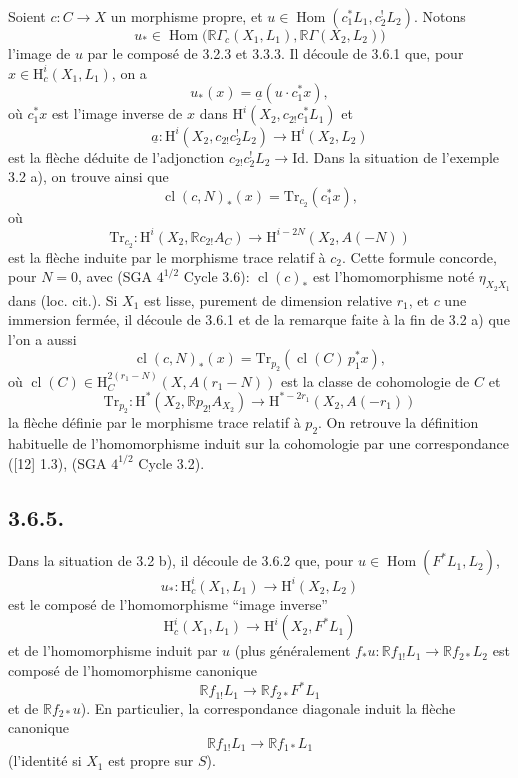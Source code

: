 \documentclass[11pt]{article}
\renewcommand{\H}{\mathrm{H}}
\DeclareMathOperator{\Hom}{Hom}
\newcommand{\R}{\mathbb{R}}\newcommand{\RHomCore}{\mathbb{R}\mathrm{Hom}}
\providecommand{\Id}{\mathrm{Id}}
\providecommand{\Hom}{\operatorname{Hom}}
\providecommand{\R}{\mathrm R}
\providecommand{\Hom}{\operatorname{Hom}}
\begin{document}
Soient $c:C\to X$ un morphisme propre, et $u\in\Hom(c_1^*L_1,c_2^!L_2)$. Notons
\[
u_*\in\Hom\bigl(\R\Gamma_c(X_1,L_1),\R\Gamma(X_2,L_2)\bigr)
\]
l'image de $u$ par le composé de 3.2.3 et 3.3.3. Il découle de 3.6.1 que, pour $x\in\H_c^i(X_1,L_1)$, on a
\begin{equation}
u_*(x)=\underline{a}(u\cdot c_1^*x),
\tag{3.6.2}
\end{equation}
où $c_1^*x$ est l'image inverse de $x$ dans $\H^i(X_2,c_{2!}c_1^*L_1)$ et
\[
\underline{a}:\H^i(X_2,c_{2!}c_2^!L_2)\longrightarrow \H^i(X_2,L_2)
\]
est la flèche déduite de l'adjonction $c_{2!}c_2^!L_2\to\Id$. Dans la situation de l'exemple 3.2 a), on trouve ainsi que
\begin{equation}
\operatorname{cl}(c,N)_*(x)=\mathrm{Tr}_{c_2}(c_1^*x),
\tag{3.6.3}
\end{equation}
où
\[
\mathrm{Tr}_{c_2}:\H^i(X_2,\R c_{2!}A_C)\longrightarrow\H^{i-2N}(X_2,A(-N))
\]
est la flèche
induite par le morphisme trace relatif à $c_2$. Cette formule concorde, pour $N=0$, avec (SGA $4^{1/2}$ Cycle 3.6): $\operatorname{cl}(c)_*$ est l'homomorphisme noté $\eta_{X_2X_1}$ dans (loc. cit.). Si $X_1$ est lisse, purement de dimension relative $r_1$, et $c$ une immersion fermée, il découle de 3.6.1 et de la remarque faite à la fin de 3.2 a) que l'on a aussi
\begin{equation}
\operatorname{cl}(c,N)_*(x)=\mathrm{Tr}_{p_2}(\operatorname{cl}(C)\,p_1^*x),
\tag{3.6.4}
\end{equation}
où $\operatorname{cl}(C)\in \H_C^{2(r_1-N)}(X,A(r_1-N))$ est la classe de cohomologie de $C$ et
\[
\mathrm{Tr}_{p_2}:\H^*(X_2,\R p_{2!}A_{X_2})\longrightarrow \H^{*-2r_1}(X_2,A(-r_1))
\]
la flèche définie par le morphisme trace relatif à $p_2$. On retrouve la définition habituelle de l'homomorphisme induit sur la cohomologie par une correspondance ([12] 1.3), (SGA $4^{1/2}$ Cycle 3.2).

\subsection*{3.6.5.}
Dans la situation de 3.2 b), il découle de 3.6.2 que, pour $u\in\Hom(F^*L_1,L_2)$,
\[
u_*:\H_c^i(X_1,L_1)\longrightarrow \H^i(X_2,L_2)
\]
est le composé de l'homomorphisme ``image inverse''
\[
\H_c^i(X_1,L_1)\longrightarrow \H^i(X_2,F^*L_1)
\]
et de l'homomorphisme induit par $u$ (plus généralement $f_*u:\R f_{1!}L_1\to \R f_{2*}L_2$ est composé de l'homomorphisme canonique
\[
\R f_{1!}L_1\longrightarrow \R f_{2*}F^*L_1
\]
et de $\R f_{2*}u$). En particulier, la correspondance diagonale induit la flèche canonique
\[
\R f_{1!}L_1\longrightarrow \R f_{1*}L_1
\]
(l'identité si $X_1$ est propre sur $S$).
\end{document}
